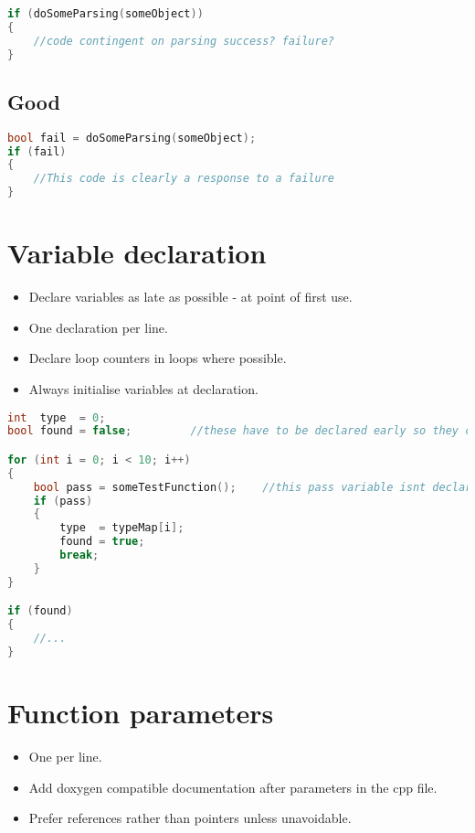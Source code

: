 \begin{lstlisting}[language=c++]
if (doSomeParsing(someObject))
{
    //code contingent on parsing success? failure?
}
\end{lstlisting}

\subsection{Good}
\begin{lstlisting}[language=c++]
bool fail = doSomeParsing(someObject);
if (fail)
{
    //This code is clearly a response to a failure
}
\end{lstlisting}

\section{Variable declaration}

\begin{itemize}
\item Declare variables as late as possible - at point of first use.
\item One declaration per line.
\item Declare loop counters in loops where possible.
\item Always initialise variables at declaration.
\end{itemize}

\begin{lstlisting}[language=c++]
int  type  = 0;
bool found = false;         //these have to be declared early so they can be used after the for loop

for (int i = 0; i < 10; i++)
{
    bool pass = someTestFunction();    //this pass variable isnt declared until it's used - good
    if (pass)
    {
        type  = typeMap[i];
        found = true;
        break;
    }
}

if (found)
{
    //...
}    
\end{lstlisting}

\section{Function parameters}

\begin{itemize}
\item One per line.
\item Add doxygen compatible documentation after parameters in the cpp file.
\item Prefer references rather than pointers unless unavoidable.
\end{itemize}

